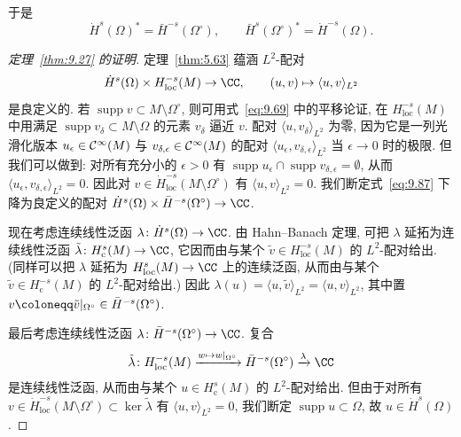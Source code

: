 于是
\begin{equation}\label{eq:9.86}
    \dot{H}^s(\Omega)^* = \bar{H}^{-s}(\Omega^\circ), \qquad \bar{H}^s(\Omega^\circ)^* = \dot{H}^{-s}(\Omega).
\end{equation}

\begin{proof}[定理~\ref{thm:9.27} 的证明]
定理~\ref{thm:5.63} 蕴涵 $L^2$-配对
\begin{equation}\label{eq:9.87}
    \dot{H}^s(\Omega) \times H_{\mathrm{loc}}^{-s}(M) \to \CC, \qquad (u, v) \mapsto \langle u, v \rangle_{L^2}
\end{equation}
是良定义的. 若 $\operatorname{supp} v \subset M \setminus \Omega^\circ$, 则可用式~\eqref{eq:9.69} 中的平移论证, 在 $H_{\mathrm{loc}}^{-s}(M)$ 中用满足 $\operatorname{supp} v_\delta \subset M \setminus \Omega$ 的元素 $v_\delta$ 逼近 $v$. 配对 $\langle u, v_\delta \rangle_{L^2}$ 为零, 因为它是一列光滑化版本 $u_\epsilon \in \mathcal{C}^\infty(M)$ 与 $v_{\delta,\epsilon} \in \mathcal{C}^\infty(M)$ 的配对 $\langle u_\epsilon, v_{\delta,\epsilon}\rangle_{L^2}$ 当 $\epsilon \to 0$ 时的极限. 但我们可以做到: 对所有充分小的 $\epsilon > 0$ 有 $\operatorname{supp} u_\epsilon \cap \operatorname{supp} v_{\delta,\epsilon} = \emptyset$, 从而 $\langle u_\epsilon, v_{\delta,\epsilon}\rangle_{L^2} = 0$. 因此对 $v \in \dot{H}_{\mathrm{loc}}^{-s}(M \setminus \Omega^\circ)$ 有 $\langle u, v\rangle_{L^2} = 0$. 我们断定式~\eqref{eq:9.87} 下降为良定义的配对 $\dot{H}^s(\Omega) \times \bar{H}^{-s}(\Omega^\circ) \to \CC$.

现在考虑连续线性泛函 $\lambda \colon \dot{H}^s(\Omega) \to \CC$. 由 Hahn--Banach 定理, 可把 $\lambda$ 延拓为连续线性泛函 $\tilde{\lambda} \colon H_{\mathrm{c}}^s(M) \to \CC$, 它因而由与某个 $\tilde{v} \in H_{\mathrm{loc}}^{-s}(M)$ 的 $L^2$-配对给出. (同样可以把 $\lambda$ 延拓为 $H_{\mathrm{loc}}^s(M) \to \CC$ 上的连续泛函, 从而由与某个 $\tilde v \in H_{\mathrm{c}}^{-s}(M)$ 的 $L^2$-配对给出.) 因此 $\lambda(u) = \langle u, \tilde v \rangle_{L^2} = \langle u, v\rangle_{L^2}$, 其中置 $v \defeq \tilde v|_{\Omega^\circ} \in \bar{H}^{-s}(\Omega^\circ)$.

最后考虑连续线性泛函 $\lambda \colon \bar{H}^{-s}(\Omega^\circ) \to \CC$. 复合
\begin{equation}\label{eq:9.88}
    \tilde{\lambda} \colon H_{\mathrm{loc}}^{-s}(M) \xrightarrow{w \mapsto w|_{\Omega^\circ}} \bar{H}^{-s}(\Omega^\circ) \xrightarrow{\lambda} \CC
\end{equation}
是连续线性泛函, 从而由与某个 $u \in H_{\mathrm{c}}^s(M)$ 的 $L^2$-配对给出. 但由于对所有 $v \in \dot{H}_{\mathrm{loc}}^{-s}(M \setminus \Omega^\circ) \subset \ker \tilde{\lambda}$ 有 $\langle u, v\rangle_{L^2} = 0$, 我们断定 $\operatorname{supp} u \subset \Omega$, 故 $u \in \dot{H}^s(\Omega)$.
\end{proof}

